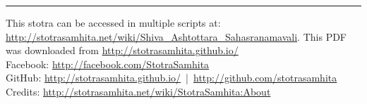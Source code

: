 \documentclass[a5paper,twoside,12pt]{book}
\begin{document}
\setmainfont[Script=Devanagari,Mapping=tex-text]{Sanskrit 2003}
\fontsize {16}{19.25}\selectfont
\begin{center}

\end{center}
\vfill
\hrule
\footnotesize
{}
\noindent\textsf{This stotra can be accessed in multiple scripts at:\\
\url{http://stotrasamhita.net/wiki/Shiva_Ashtottara_Sahasranamavali}. This PDF was downloaded from \url{http://stotrasamhita.github.io/}\\[1ex]
Facebook: \url{http://facebook.com/StotraSamhita}\\[0.7ex]
GitHub: \url{http://stotrasamhita.github.io/}~|~\url{http://github.com/stotrasamhita}\\[0.7ex]
Credits: \url{http://stotrasamhita.net/wiki/StotraSamhita:About}}
\end{document}
